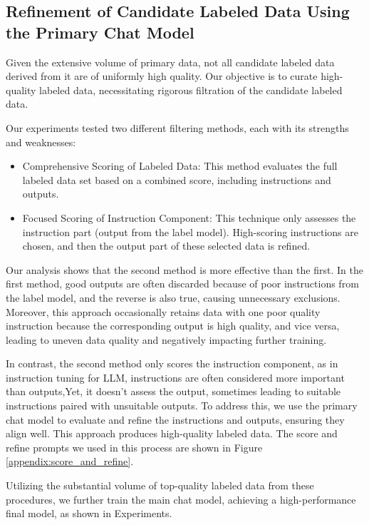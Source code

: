 \subsection{Refinement of Candidate Labeled Data Using the Primary Chat Model}

Given the extensive volume of primary data, not all candidate labeled data derived from it are of uniformly high quality. Our objective is to curate high-quality labeled data, necessitating rigorous filtration of the candidate labeled data.

Our experiments tested two different filtering methods, each with its strengths and weaknesses:
\begin{itemize}

    \item Comprehensive Scoring of Labeled Data: This method evaluates the full labeled data set based on a combined score, including instructions and outputs.

    \item Focused Scoring of Instruction Component: This technique only assesses the instruction part (output from the label model). High-scoring instructions are chosen, and then the output part of these selected data is refined.
\end{itemize}

Our analysis shows that the second method is more effective than the first. In the first method, good outputs are often discarded because of poor instructions from the label model, and the reverse is also true, causing unnecessary exclusions. Moreover, this approach occasionally  retains data with one poor quality instruction because the corresponding output is high quality, and vice versa, leading to uneven data quality and negatively impacting further training.

In contrast, the second method only scores the instruction component,
as in instruction tuning for LLM, instructions are often considered more important than outputs,Yet, it doesn't assess the output, sometimes leading to suitable instructions paired with unsuitable outputs. To address this, we use the primary chat model to evaluate and refine the instructions and outputs, ensuring they align well. This approach produces high-quality labeled data. The score and refine prompts we used in this process are shown in Figure \ref{appendix:score_and_refine}.

Utilizing the substantial volume of top-quality labeled data from these procedures, we further train the main chat model, achieving a high-performance final model, as shown in Experiments.

